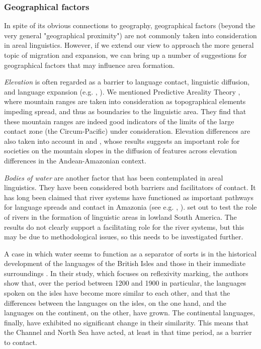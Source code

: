 \documentclass[output=paper,
modfonts
]{langscibook}
\begin{document}
\subsubsection{Geographical factors} \label{subsec:geofactors}

In spite of its obvious connections to geography, geographical factors (beyond the very general "geographical proximity") are not commonly taken into consideration in areal linguistics. However, if we extend our view to approach the more general topic of migration and expansion, we can bring up a number of suggestions for geographical factors that may influence area formation.

\textit{Elevation} is often regarded as a barrier to language contact, linguistic diffusion, and language expansion (e.g. \citealt{Nichols1992Linguistic}, \citeyear{nichols1997modeling}). We mentioned Predictive Areality Theory \parencite{Bickeletal2006Oceania}, where mountain ranges are taken into consideration as topographical elements impeding spread, and thus as boundaries to the linguistic area. They find that these mountain ranges are indeed good indicators of the limits of the large contact zone (the Circum-Pacific) under consideration. Elevation differences are also taken into account in \textcite{gijn2014andean} and \textcite{gijnetalInpressHighland}, whose results suggests an important role for societies on the mountain slopes in the diffusion of features across elevation differences in the Andean-Amazonian context.

\textit{Bodies of water} are another factor that has been contemplated in areal linguistics. They have been considered both barriers and facilitators of contact. It has long been claimed that river systems have functioned as important pathways for language spreads and contact in Amazonia (see e.g. \citep{hornborg2005ethnogenesis}, \citep{eriksen2011nature}). \textcite{gijnetal2017linguistic}
set out to test the role of rivers in the formation of linguistic areas in lowland South America. The results do not clearly support a facilitating role for the river systems, but this may be due to methodological issues, so this needs to be investigated further.

A case in which water seems to function as a separator of sorts is in the historical development of the languages of the British Isles and those in their immediate surroundings \parencite{dedioetalforthcevidence}. In their study, which focuses on reflexivity marking, the authors show that, over the period between 1200 and 1900 in particular, the languages spoken on the isles have become more similar to each other, and that the differences between the languages on the isles, on the one hand, and the languages on the continent, on the other, have grown. The continental languages, finally, have exhibited no significant change in their similarity. This means that the Channel and North Sea have acted, at least in that time period, as a barrier to contact. 
\end{document}
